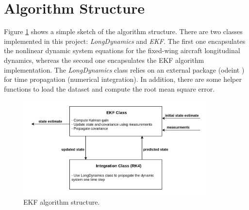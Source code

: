\documentclass{article}
\begin{document}
\section{Algorithm Structure}
Figure \ref{Fig:EKF_Algorithm_Sketch} shows a simple sketch of the algorithm structure. 
There are two classes implemented in this project: \textit{LongDynamics} and \textit{EKF}. 
The first one encapsulates the nonlinear dynamic system equations for the fixed-wing aircraft longitudinal dynamics, 
whereas the second one encapsulates the EKF algorithm implementation. The \textit{LongDynamics} class relies on an external 
package (odeint \cite{odeint_website}) for time propagation (numerical integration). 
In addition, there are some helper functions to load the dataset and compute the root mean square error.
\begin{figure}[h]
    \centering
    \includegraphics[width=0.9\textwidth]{EKF_Algorithm.png}
    \caption{EKF algorithm structure.}
    \label{Fig:EKF_Algorithm_Sketch}
\end{figure}



\end{document}

